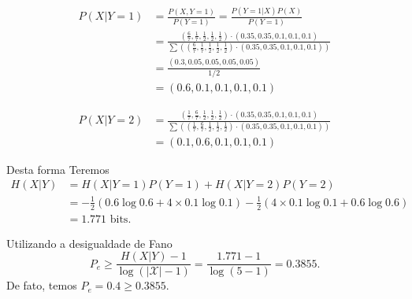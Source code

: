 \begin{example}
  \begin{subequations}
    \begin{align}
      P(X|Y=1) &= \frac{P(X,Y=1)}{P(Y=1)} = \frac{P(Y=1|X)P(X)}{P(Y=1)} \\
        &= \frac{(\frac{6}{7}, \frac{1}{7}, \frac{1}{2}, \frac{1}{2}, \frac{1}{2}) \cdot (0.35, 0.35, 0.1, 0.1, 0.1) }{ \sum \left( (\frac{6}{7}, \frac{1}{7}, \frac{1}{2}, \frac{1}{2}, \frac{1}{2}) \cdot (0.35, 0.35, 0.1, 0.1, 0.1)  \right)  } \\
        &= \frac{(0.3, 0.05, 0.05, 0.05, 0.05)}{1/2} \\
        &= (0.6, 0.1, 0.1, 0.1, 0.1)
    \end{align}
  \end{subequations}

  \begin{subequations}
    \begin{align}
      P(X|Y=2) &= \frac{(\frac{1}{7}, \frac{6}{7}, \frac{1}{2}, \frac{1}{2}, \frac{1}{2}) \cdot (0.35, 0.35, 0.1, 0.1, 0.1) }{ \sum \left( (\frac{1}{7}, \frac{6}{7}, \frac{1}{2}, \frac{1}{2}, \frac{1}{2}) \cdot (0.35, 0.35, 0.1, 0.1, 0.1)  \right)  } \\
        &= (0.1, 0.6, 0.1, 0.1, 0.1)
    \end{align}
  \end{subequations}

  Desta forma Teremos
  \begin{subequations}
    \begin{align}
      H(X|Y) &= H(X|Y=1) P(Y=1) + H(X|Y=2) P(Y=2)  \\
        &= - \frac{1}{2} \left( 0.6 \log 0.6 + 4 \times 0.1 \log 0.1 \right) - \frac{1}{2} \left( 4 \times 0.1 \log 0.1 + 0.6 \log 0.6 \right) \\
        &= 1.771 \text{ bits. }
    \end{align}
  \end{subequations}

  Utilizando a desigualdade de Fano
  \begin{equation}
    P_e \geq \frac{H(X|Y) - 1}{\log \left( \vert \mathcal{X} \vert -1 \right)} = \frac{1.771 - 1}{ \log (5-1)} = 0.3855.
  \end{equation}
  De fato, temos $P_e = 0.4 \geq 0.3855$.
  \end{example}









